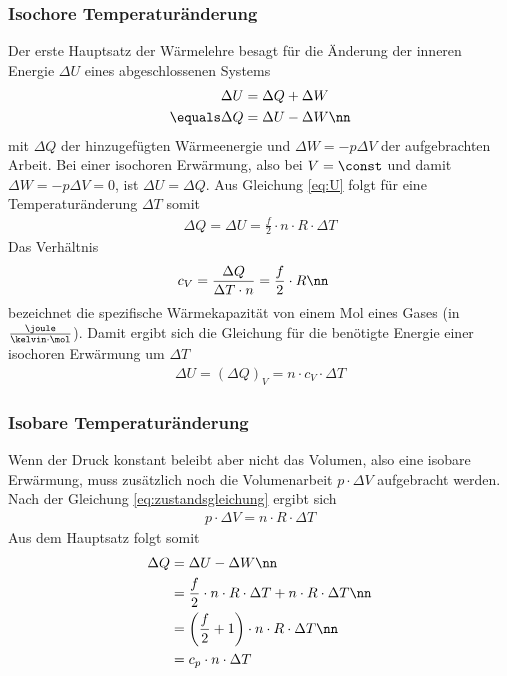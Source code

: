 \documentclass[12pt, a4paper, twoside]{scrartcl}
\begin{document}
\subsubsection*{Isochore Temperaturänderung}
Der erste Hauptsatz der Wärmelehre besagt für die Änderung der inneren Energie $\Delta U$ eines abgeschlossenen Systems
\begin{align}
 \Delta U &= \Delta Q + \Delta W \label{eq:HS} \\
\equals \Delta Q &= \Delta U - \Delta W \nn 
\end{align}
mit $\Delta Q$ der hinzugefügten Wärmeenergie und $\Delta W = -p \Delta V$ der aufgebrachten Arbeit.
Bei einer isochoren Erwärmung, also bei $V = \const$ und damit $\Delta W = -p \Delta V = 0$, ist $\Delta U = \Delta Q$.
Aus Gleichung \eqref{eq:U} folgt für eine Temperaturänderung $\Delta T$ somit
\begin{align}
 \Delta Q = \Delta U = \frac{f}{2}\cdot n \cdot R \cdot \Delta T \label{eq:1}
\end{align}
Das Verhältnis
\begin{align}
 c_V &= \frac{\Delta Q}{\Delta T \cdot n} = \frac{f}{2} \cdot R \nn
\end{align}
bezeichnet die spezifische Wärmekapazität von einem Mol eines Gases (in $\frac{\joule}{\kelvin\cdot\mol}$).
Damit ergibt sich die Gleichung für die benötigte Energie einer isochoren Erwärmung um $\Delta T$
\begin{align}
 \Delta U = \left(\Delta Q\right)_V = n\cdot c_V \cdot \Delta T \label{eq:dU_V}
\end{align}

\subsubsection*{Isobare Temperaturänderung}
Wenn der Druck konstant beleibt aber nicht das Volumen, also eine isobare Erwärmung, muss zusätzlich noch die Volumenarbeit $p \cdot\Delta V$ aufgebracht werden.
Nach der Gleichung \eqref{eq:zustandsgleichung} ergibt sich
\begin{align}
 p\cdot\Delta V = n\cdot R\cdot \Delta T
\end{align}
Aus dem Hauptsatz folgt somit
\begin{align}
 \Delta Q &= \Delta U - \Delta W \nn\\
          &= \frac{f}{2} \cdot n\cdot R\cdot \Delta T + n\cdot R\cdot \Delta T \nn\\
          &= \left(\frac{f}{2}+1\right) \cdot n\cdot R\cdot \Delta T \nn\\
          &= c_p \cdot n\cdot \Delta T
\end{align}
\end{document}
